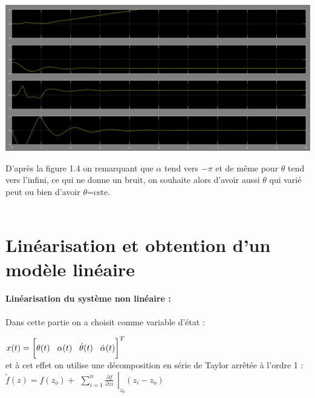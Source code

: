 \documentclass[12pt, a4paper, openany]{report}
\begin{document}
\begin{center}
\includegraphics[scale=0.4]{alpha=-1.PNG}
\label{fig1} 
\end{center}

D’après la figure 1.4 on remarquant que $\alpha$ tend vers $-\pi$ et de même pour $\theta$
tend vers l'infini, ce qui ne donne un bruit, on souhaite alors d'avoir aussi $\theta$ qui varié peut ou bien d'avoir $\theta$=cste.\\\\

\section{Linéarisation et obtention d'un modèle linéaire}
\paragraph{Linéarisation du système non linéaire :\\}
Dans cette partie on a choisit comme variable d'état :

 $x(t)=\bigg[\theta(t)\hspace{3mm}\alpha(t)\hspace{3mm} \dot{\theta}(t)\hspace{3mm} \dot{\alpha}(t)\bigg]^{T}$ \\  
   et à cet effet on utilise une décomposition en série de Taylor arrêtée à l'ordre 1 :\\
   
   $\tilde{f}(z)=f(z_{o})+\left.\begin{matrix}\sum_{i=1}^{n}\frac{\partial f }{\partial zi}\end{matrix}\right|_{z_0} (z_{i}-z_{o})$ \\\\ 
   
\end{document}
